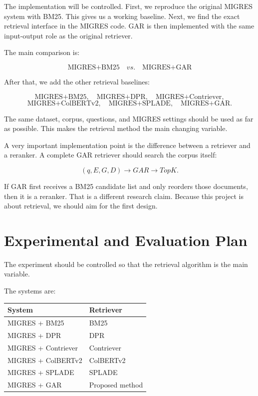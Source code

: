\documentclass[11pt,a4paper]{article}
\begin{document}
The implementation will be controlled. First, we reproduce the original MIGRES system with BM25. This gives us a working baseline. Next, we find the exact retrieval interface in the MIGRES code. GAR is then implemented with the same input-output role as the original retriever.

The main comparison is:

\[
\boxed{\text{MIGRES+BM25}\quad vs.\quad\text{MIGRES+GAR}}
\]

After that, we add the other retrieval baselines:

\[
\text{MIGRES+BM25},\quad
\text{MIGRES+DPR},\quad
\text{MIGRES+Contriever},
\]
\[
\text{MIGRES+ColBERTv2},\quad
\text{MIGRES+SPLADE},\quad
\text{MIGRES+GAR}.
\]

The same dataset, corpus, questions, and MIGRES settings should be used as far as possible. This makes the retrieval method the main changing variable.

A very important implementation point is the difference between a retriever and a reranker. A complete GAR retriever should search the corpus itself:

\[
(q,E,G,D)\rightarrow GAR\rightarrow TopK.
\]

If GAR first receives a BM25 candidate list and only reorders those documents, then it is a reranker. That is a different research claim. Because this project is about retrieval, we should aim for the first design.


\section{Experimental and Evaluation Plan}

The experiment should be controlled so that the retrieval algorithm is the main variable.

The systems are:

\begin{center}
\begin{tabular}{ll}
\toprule
\textbf{System} & \textbf{Retriever}\\
\midrule
MIGRES + BM25 & BM25\\
MIGRES + DPR & DPR\\
MIGRES + Contriever & Contriever\\
MIGRES + ColBERTv2 & ColBERTv2\\
MIGRES + SPLADE & SPLADE\\
MIGRES + GAR & Proposed method\\
\bottomrule
\end{tabular}
\end{center}
\end{document}
